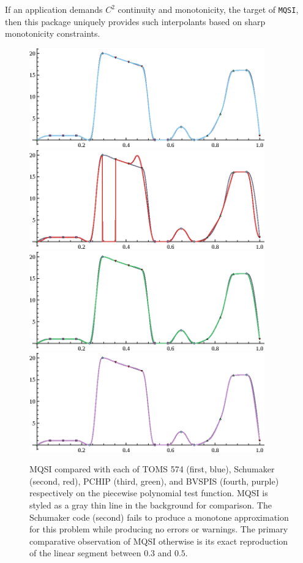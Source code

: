 If an application demands $C^2$ continuity and monotonicity, the
target of {\tt MQSI}, then this package uniquely provides such
interpolants based on sharp monotonicity constraints.

\goodbreak

\begin{figure}[h]
  \centering
\includegraphics[width=4in]{vis/comparisons/piecewise-polynomial/1-toms574.eps}
\includegraphics[width=4in]{vis/comparisons/piecewise-polynomial/2-schumaker.eps}
\includegraphics[width=4in]{vis/comparisons/piecewise-polynomial/3-pchip.eps}
\includegraphics[width=4in]{vis/comparisons/piecewise-polynomial/4-bvspis.eps}
\caption{ %
{\ttVIII MQSI} compared with each of TOMS 574 (first, blue), Schumaker
(second, red), {\ttVIII PCHIP} (third, green), and {\ttVIII BVSPIS}
(fourth, purple) respectively on the {\itVIII piecewise polynomial}
test function. {\ttVIII MQSI} is styled as a gray thin line in the
background for comparison. The Schumaker code (second) fails to
produce a monotone approximation for this problem while producing no
errors or warnings. The primary comparative observation of {\ttVIII
  MQSI} otherwise is its exact reproduction of the linear segment
between $0.3$ and $0.5$.}
\end{figure}

